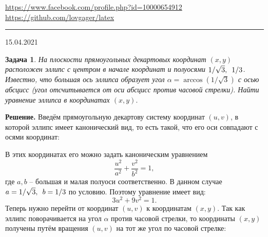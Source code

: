 \documentclass[12pt]{article}
\begin{document}


\begin{flushleft}
\url{https://www.facebook.com/profile.php?id=10000654912}
\url{https://github.com/lovgager/latex}
\end{flushleft}
\hrule 
\begin{flushright}
15.04.2021
\end{flushright}
\bigskip


\newtheorem*{task}{Задача}
\begin{task}
На плоскости прямоугольных декартовых координат $(x,y)$ расположен эллипс с центром в начале координат и полуосями $1/\sqrt{3}, \enskip 1/3$. Известно, что большая ось эллипса образует угол $\alpha = \arccos{(1/\sqrt{3})}$ с осью абсцисс (угол отсчитывается от оси абсцисс против часовой стрелки). Найти уравнение эллипса в координатах $(x,y).$
\end{task}

\noindent\textbf{Решение.} Введём прямоугольную декартову систему координат $(u,v)$, в которой эллипс имеет канонический вид, то есть такой, что его оси совпадают с осями координат:
\begin{figure}[ht]\centering
    \def\svgwidth{7cm}
    
\end{figure}

\noindent В этих координатах его можно задать каноническим уравнением 
\begin{equation*}
    \frac{u^2}{a^2} + \frac{v^2}{b^2} = 1,
\end{equation*}
где $a,b$ -- большая и малая полуоси соответственно. В данном случае $a=1/\sqrt{3}, \enskip b=1/3$ по условию. Поэтому уравнение имеет вид:
\begin{equation}\label{canon_eq}
    3u^2+9v^2=1.
\end{equation}
Теперь нужно перейти от координат $(u,v)$ к координатам $(x,y)$. Так как эллипс поворачивается на угол $\alpha$ против часовой стрелки, то координаты $(x,y)$ получены путём вращения $(u,v)$ на тот же угол по часовой стрелке:
\begin{figure}[ht]\centering
    \def\svgwidth{7cm}
    
\end{figure}
\end{document}
